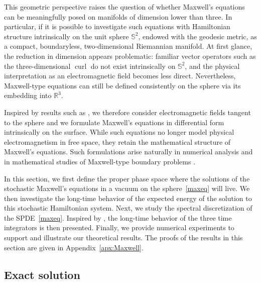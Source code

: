 \documentclass[11pt]{amsart}
\newcommand{\R}{{\mathbb R}}
\newcommand{\IS}{\mathbb{S}}
\begin{document}
This geometric perspective raises the question of whether Maxwell's equations can be meaningfully posed on manifolds of dimension lower than three. In particular, if it is possible to investigate such equations with Hamiltonian structure intrinsically on the unit sphere $\IS^2$, endowed with the geodesic metric, as a compact, boundaryless, two-dimensional Riemannian manifold. At first glance, the reduction in dimension appears problematic: familiar vector operators such as the three-dimensional $\operatorname{curl}$ do not exist intrinsically on $\IS^2$, and the physical interpretation as an electromagnetic field becomes less direct. 
Nevertheless,
Maxwell-type equations can still be defined consistently on the sphere via its embedding into $\R^3$.

Inspired by results such as \cite{1138693,MR4739347}, we therefore consider electromagnetic fields tangent to the sphere and we formulate Maxwell's equations in differential form intrinsically on the surface. 
While such equations no longer model physical electromagnetism in free space, they retain the mathematical structure of Maxwell's equations. Such formulations arise naturally in numerical analysis and in mathematical studies of Maxwell-type boundary problems \cite{MR3635830,MR4447703,Hiptmair_2002,MR4410964,MR4739347}. 


In this section, we first define the proper phase space where 
the solutions of the stochastic Maxwell's equations in a vacuum on
the sphere~\eqref{maxeq} will live. We then investigate the long-time behavior of the expected energy of the solution to this stochastic Hamiltonian system.
Next, we study the spectral discretization of the SPDE~\eqref{maxeq}. Inspired by \cite{MR4077824}, the long-time behavior of the three time integrators is then presented. Finally, we provide numerical experiments to support and illustrate our theoretical results.
The proofs of the results in this section are given in Appendix~\ref{apx:Maxwell}.

\subsection{Exact solution}
\end{document}
